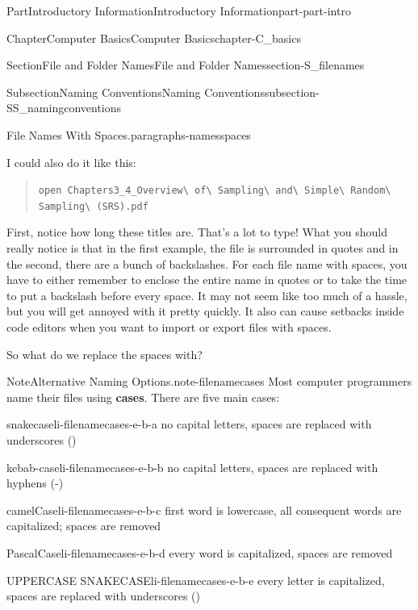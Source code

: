 \documentclass[twoside,10pt,]{book}
\newcommand{\mono}[1]{\texttt{#1}}
\newcommand{\terminology}[1]{\textbf{#1}}
\begin{document}
\begin{partptx}{Part}{Introductory Information}{}{Introductory Information}{}{}{part-part-intro}
\begin{chapterptx}{Chapter}{Computer Basics}{}{Computer Basics}{}{}{chapter-C_basics}
\begin{sectionptx}{Section}{File and Folder Names}{}{File and Folder Names}{}{}{section-S_filenames}
\begin{subsectionptx}{Subsection}{Naming Conventions}{}{Naming Conventions}{}{}{subsection-SS_namingconventions}
\begin{paragraphs}{File Names With Spaces.}{paragraphs-namesspaces}
\begin{quote}
\end{quote}
I could also do it like this:%
\begin{quote}%
\mono{open Chapters3\_4\_Overview\textbackslash{} of\textbackslash{} Sampling\textbackslash{} and\textbackslash{} Simple\textbackslash{} Random\textbackslash{} Sampling\textbackslash{} (SRS).pdf}%
\end{quote}
First, notice how long these titles are. That's a lot to type! What you should really notice is that in the first example, the file is surrounded in quotes and in the second, there are a bunch of backslashes. For each file name with spaces, you have to either remember to enclose the entire name in quotes or to take the time to put a backslash before every space. It may not seem like too much of a hassle, but you will get annoyed with it pretty quickly. It also can cause setbacks inside code editors when you want to import or export files with spaces.%
\par
So what do we replace the spaces with?%
\begin{note}{Note}{Alternative Naming Options.}{note-filenamecases}%
%
%
%
Most computer programmers name their files using \terminology{cases}. There are five main cases:%
\begin{descriptionlist}
\begin{dlimedium}{snake\textunderscore{}case}{li-filenamecases-e-b-a}%
no capital letters, spaces are replaced with underscores (\textunderscore{})%
\end{dlimedium}%
\begin{dlimedium}{kebab-case}{li-filenamecases-e-b-b}%
no capital letters, spaces are replaced with hyphens (-)%
\end{dlimedium}%
\begin{dlimedium}{camelCase}{li-filenamecases-e-b-c}%
first word is lowercase, all consequent words are capitalized; spaces are removed%
\end{dlimedium}%
\begin{dlimedium}{PascalCase}{li-filenamecases-e-b-d}%
every word is capitalized, spaces are removed%
\end{dlimedium}%
\begin{dlimedium}{UPPER\textunderscore{}CASE\textunderscore{} SNAKE\textunderscore{}CASE}{li-filenamecases-e-b-e}%
every letter is capitalized, spaces are replaced with underscores (\textunderscore{})%
\end{dlimedium}%
\end{descriptionlist}

\end{note}
\end{paragraphs}
\end{subsectionptx}
\end{sectionptx}
\end{chapterptx}
\end{partptx}
\end{document}
